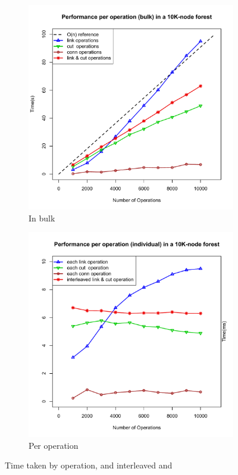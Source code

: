\begin{figure}[H]
\centering
\begin{subfigure}{.5\textwidth}
  \centering
  \includegraphics[scale=0.38]{./Images/plotEach}
  \caption{In bulk}
\end{subfigure}%
\begin{subfigure}{.5\textwidth}
  \centering
  \includegraphics[scale=0.38]{./Images/plotOpsIndiv}
  \caption{Per operation}
\end{subfigure}
\caption{Time taken by operation, and interleaved \link and \cut}
\label{fig:EachOp}
\end{figure}

